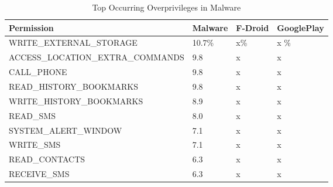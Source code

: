 \documentclass[conference]{IEEEtran}
\begin{document}




\begin{table}[t]

\caption{Top Occurring Overprivileges in Malware}
\label{Table:mal_permissions}
  \begin{tabular}{ | p{5.3cm} | p{1.0cm} | p{1.2cm} | p{1.2cm} |} \hline

  \bfseries Permission&\bfseries Malware&\bfseries F-Droid  &\bfseries GooglePlay\\ \hline
  WRITE\_EXTERNAL\_STORAGE & 10.7\% & x\%  & x \%  \\ \hline
  ACCESS\_LOCATION\_EXTRA\_COMMANDS & 9.8 & x & x \\ \hline
  CALL\_PHONE& 9.8 & x & x \\ \hline
  READ\_HISTORY\_BOOKMARKS & 9.8 & x & x \ \\ \hline
  WRITE\_HISTORY\_BOOKMARKS & 8.9 & x & x \\ \hline
  READ\_SMS & 8.0 & x & x\\ \hline
  SYSTEM\_ALERT\_WINDOW & 7.1 & x & x \\ \hline
  WRITE\_SMS & 7.1 & x & x \\ \hline
  READ\_CONTACTS & 6.3 & x & x\\ \hline
  RECEIVE\_SMS & 6.3 & x & x \\ \hline
  \end{tabular}

\end{table}

\end{document}
